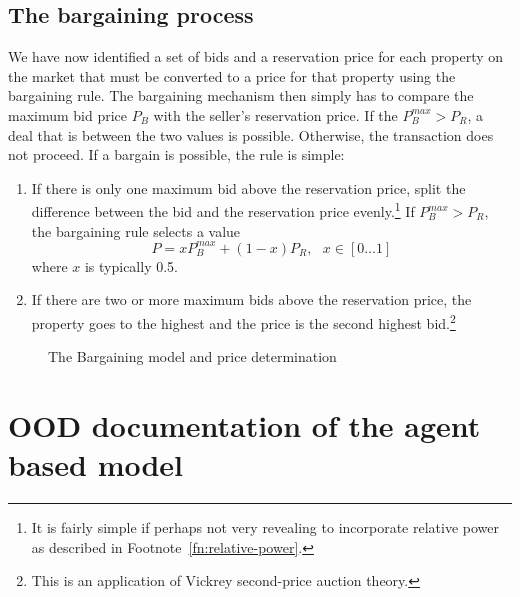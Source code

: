 {\subsection{The bargaining process}
We have now identified a set of bids and a reservation price for each property on the market that must be converted to a price for that property using the bargaining rule. 
The bargaining  mechanism then simply has to compare the maximum bid price $P_B$ with the seller's reservation price. If the $P_B^{max}>P_R$, a deal that is between the two values is possible. Otherwise, the transaction does not proceed.
If a bargain is possible, the rule is simple: 
\begin{enumerate}
    \item If there is only one maximum bid above the reservation price, split the difference between the bid and the reservation price evenly.\footnote{It is fairly simple if perhaps not very revealing to incorporate relative power as described in Footnote~\ref{fn:relative-power}.} If $P_B^{max}>P_R$,  the bargaining rule selects a value 
    \[P = xP_B^{max}+(1-x)P_R, \ \ \ x\in [0\dots 1] \]
where $x$ is typically 0.5.
    \item If there are two or more maximum bids above the reservation price, the property goes to the highest  and the price is the second highest bid.\footnote{This is an application of Vickrey \gls{second-price auction} theory\cite{levinAuctionTheory2004}.} 

\end{enumerate}
  
    \begin{figure}[!thb]
    \centering
    
    \caption{The Bargaining model and price determination}
    \label{fig:Bargaining}
    \end{figure}






{\color{red}
\section{OOD documentation of the agent based model}

}}
